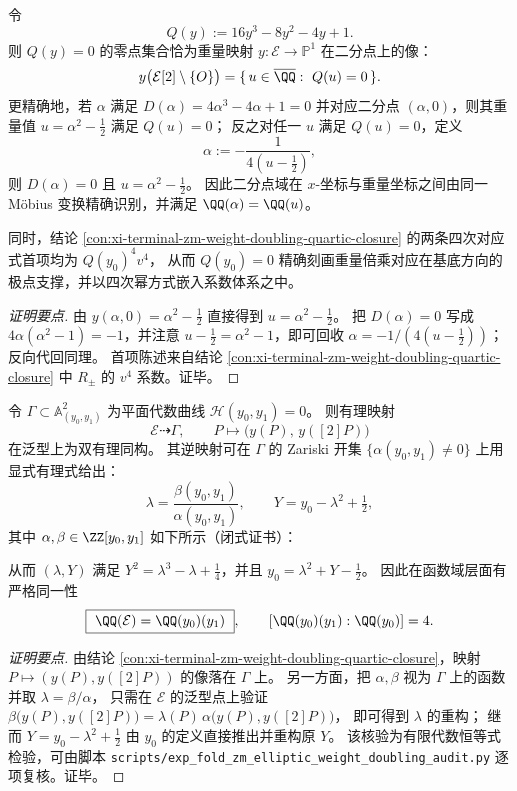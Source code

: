 \begin{conclusion}[重量二分点三次多项式的几何刻画：\texorpdfstring{$Q(y)=0$}{Q(y)=0} 给出极点集合与二分点域同构]\label{con:xi-terminal-zm-weight-doubling-2torsion-q-cubic}
令
\[
Q(y):=16y^{3}-8y^{2}-4y+1.
\]
则 \(Q(y)=0\) 的零点集合恰为重量映射 \(y:\mathcal{E}\to\mathbb{P}^{1}\) 在二分点上的像：
\[
y\bigl(\mathcal{E}[2]\setminus\{O\}\bigr)=\{\,u\in\overline{\QQ}:\ Q(u)=0\,\}.
\]
更精确地，若 \(\alpha\) 满足 \(D(\alpha)=4\alpha^{3}-4\alpha+1=0\) 并对应二分点 \((\alpha,0)\)，则其重量值
\(
u=\alpha^{2}-\tfrac12
\)
满足 \(Q(u)=0\)；
反之对任一 \(u\) 满足 \(Q(u)=0\)，定义
\[
\alpha:=-\frac{1}{4(u-\tfrac12)},
\]
则 \(D(\alpha)=0\) 且 \(u=\alpha^{2}-\tfrac12\)。
因此二分点域在 \(x\)-坐标与重量坐标之间由同一 Möbius 变换精确识别，并满足 \(\QQ(\alpha)=\QQ(u)\)。
\par
同时，结论 \ref{con:xi-terminal-zm-weight-doubling-quartic-closure} 的两条四次对应式首项均为 \(Q(y_0)^{4}v^{4}\)，
从而 \(Q(y_0)=0\) 精确刻画重量倍乘对应在基底方向的极点支撑，并以四次幂方式嵌入系数体系之中。
\end{conclusion}
\begin{proof}[证明要点]
由 \(y(\alpha,0)=\alpha^{2}-\tfrac12\) 直接得到 \(u=\alpha^{2}-\tfrac12\)。
把 \(D(\alpha)=0\) 写成 \(4\alpha(\alpha^{2}-1)=-1\)，并注意 \(u-\tfrac12=\alpha^{2}-1\)，即可回收 \(\alpha=-1/(4(u-\tfrac12))\)；
反向代回同理。
首项陈述来自结论 \ref{con:xi-terminal-zm-weight-doubling-quartic-closure} 中 \(R_{\pm}\) 的 \(v^{4}\) 系数。证毕。
\end{proof}

\begin{conclusion}[倍乘对应图曲线的椭圆化：\texorpdfstring{$\mathcal H(y_0,y_1)=0$}{H=0} 的归一化同构于 \texorpdfstring{$\mathcal{E}$}{E}]\label{con:xi-terminal-zm-weight-doubling-elliptic-normalization}
令 \(\Gamma\subset\mathbb{A}^{2}_{(y_0,y_1)}\) 为平面代数曲线 \(\mathcal H(y_0,y_1)=0\)。
则有理映射
\[
\mathcal{E}\dashrightarrow\Gamma,\qquad
P\longmapsto \bigl(y(P),\,y([2]P)\bigr)
\]
在泛型上为双有理同构。
其逆映射可在 \(\Gamma\) 的 Zariski 开集 \(\{\alpha(y_0,y_1)\neq 0\}\) 上用显式有理式给出：
\[
\lambda=\frac{\beta(y_0,y_1)}{\alpha(y_0,y_1)},\qquad
Y=y_0-\lambda^{2}+\tfrac12,
\]
其中 \(\alpha,\beta\in\ZZ[y_0,y_1]\) 如下所示（闭式证书）：

从而 \((\lambda,Y)\) 满足 \(Y^{2}=\lambda^{3}-\lambda+\tfrac14\)，并且 \(y_0=\lambda^{2}+Y-\tfrac12\)。
因此在函数域层面有严格同一性
\[
\boxed{\ \QQ(\mathcal E)=\QQ(y_0)(y_1)\ },
\qquad [\QQ(y_0)(y_1):\QQ(y_0)]=4.
\]
\end{conclusion}
\begin{proof}[证明要点]
由结论 \ref{con:xi-terminal-zm-weight-doubling-quartic-closure}，映射 \(P\mapsto(y(P),y([2]P))\) 的像落在 \(\Gamma\) 上。
另一方面，把 \(\alpha,\beta\) 视为 \(\Gamma\) 上的函数并取 \(\lambda=\beta/\alpha\)，
只需在 \(\mathcal{E}\) 的泛型点上验证
\(
\beta\bigl(y(P),y([2]P)\bigr)=\lambda(P)\,\alpha\bigl(y(P),y([2]P)\bigr)
\)，
即可得到 \(\lambda\) 的重构；
继而 \(Y=y_0-\lambda^{2}+\tfrac12\) 由 \(y_0\) 的定义直接推出并重构原 \(Y\)。
该核验为有限代数恒等式检验，可由脚本 \texttt{scripts/exp\_fold\_zm\_elliptic\_weight\_doubling\_audit.py} 逐项复核。证毕。
\end{proof}

